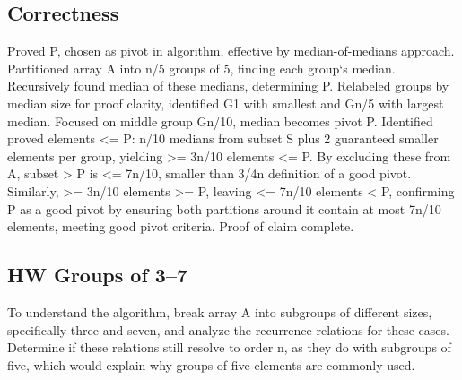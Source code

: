 \subsection*{Correctness}
Proved P, chosen as pivot in algorithm, effective by median-of-medians approach.
Partitioned array A into n/5 groups of 5, finding each group`s median.
Recursively found median of these medians, determining P\@.
Relabeled groups by median size for proof clarity, identified G1 with smallest and Gn/5 with largest median.
Focused on middle group Gn/10, median becomes pivot P\@.
Identified proved elements \textless{}= P: n/10 medians from subset S plus 2 guaranteed smaller elements per group, yielding \textgreater{}= 3n/10 elements \textless{}= P\@.
By excluding these from A, subset \textgreater{} P is \textless{}= 7n/10, smaller than 3/4n definition of a good pivot.
Similarly, \textgreater{}= 3n/10 elements \textgreater{}= P, leaving \textless{}= 7n/10 elements \textless{} P, confirming P as a good pivot by ensuring both partitions around it contain at most 7n/10 elements, meeting good pivot criteria.
Proof of claim complete.

\subsection*{HW  Groups of 3--7}
To understand the algorithm, break array A into subgroups of different sizes, specifically three and seven, and analyze the recurrence relations for these cases.
Determine if these relations still resolve to order n, as they do with subgroups of five, which would explain why groups of five elements are commonly used.

